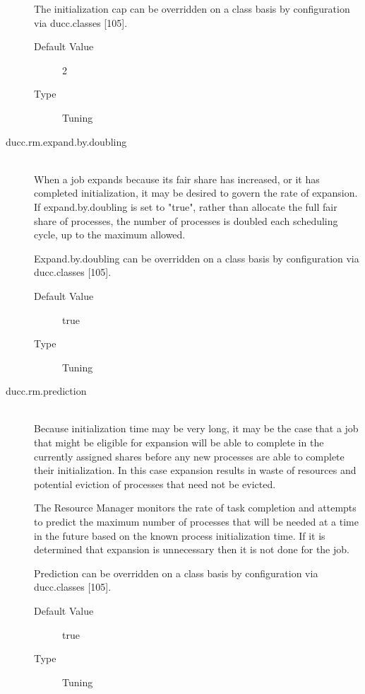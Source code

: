 \begin{description}
          The initialization cap can be overridden on a class basis by configuration via           
          ducc.classes [105]. 
          \begin{description}
            \item[Default Value] 2             
            \item[Type] Tuning 
          \end{description}
          

        \item[ducc.rm.expand.by.doubling] \hfill \\
          When a job expands because its fair share has increased, or it has completed initialization, 
          it may be desired to govern the rate of expansion. If expand.by.doubling is set to "true", 
          rather than allocate the full fair share of processes, the number of processes is doubled 
          each scheduling cycle, up to the maximum allowed. 

          Expand.by.doubling can be overridden on a class basis by configuration via 
          ducc.classes [105]. 

          \begin{description}
            \item[Default Value] true 
            \item[Type] Tuning 
          \end{description}
          

        \item[ducc.rm.prediction] \hfill \\
          Because initialization time may be very long, it may be the case that a job that might be 
          eligible for expansion will be able to complete in the currently assigned shares before any 
          new processes are able to complete their initialization. In this case expansion results in 
          waste of resources and potential eviction of processes that need not be evicted. 
          
          The Resource Manager monitors the rate of task completion and attempts to predict the 
          maximum number of processes that will be needed at a time in the future based on the 
          known process initialization time. If it is determined that expansion is unnecessary then it 
          is not done for the job. 
          
          Prediction can be overridden on a class basis by configuration via ducc.classes [105].           
          \begin{description}
            \item[Default Value] true 
            \item[Type] Tuning 
          \end{description}
          


\end{description}
